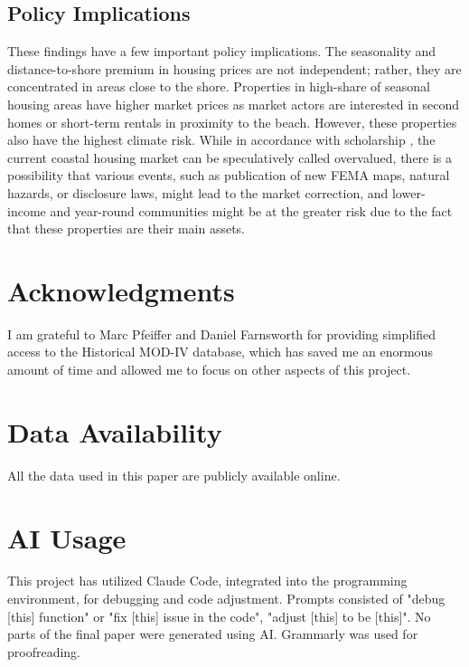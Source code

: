 \documentclass[11pt]{article}
\begin{document}
\subsection{Policy Implications}\label{sec:policy}

    These findings have a few important policy implications. The seasonality and distance-to-shore premium in housing prices are not independent; rather, they are concentrated in areas close to the shore. Properties in high-share of seasonal housing areas have higher market prices as market actors are interested in second homes or short-term rentals in proximity to the beach. However, these properties also have the highest climate risk. While in accordance with scholarship \parencite{gourevitchetal2023-UnpricedClimateRisk}, the current coastal housing market can be speculatively called overvalued, there is a possibility that various events, such as publication of new FEMA maps, natural hazards, or disclosure laws, might lead to the market correction, and lower-income and year-round communities might be at the greater risk due to the fact that these properties are their main assets. 

\section*{Acknowledgments}

\noindent I am grateful to Marc Pfeiffer and Daniel Farnsworth for providing simplified access to the Historical MOD-IV database, which has saved me an enormous amount of time and allowed me to focus on other aspects of this project. 

\section*{Data Availability}

\noindent All the data used in this paper are publicly available online. 

\section*{AI Usage}
\noindent This project has utilized Claude Code, integrated into the programming environment, for debugging and code adjustment. Prompts consisted of "debug [this] function" or "fix [this] issue in the code", "adjust [this] to be [this]". No parts of the final paper were generated using AI. Grammarly was used for proofreading. 

\printbibliography
\end{document}
